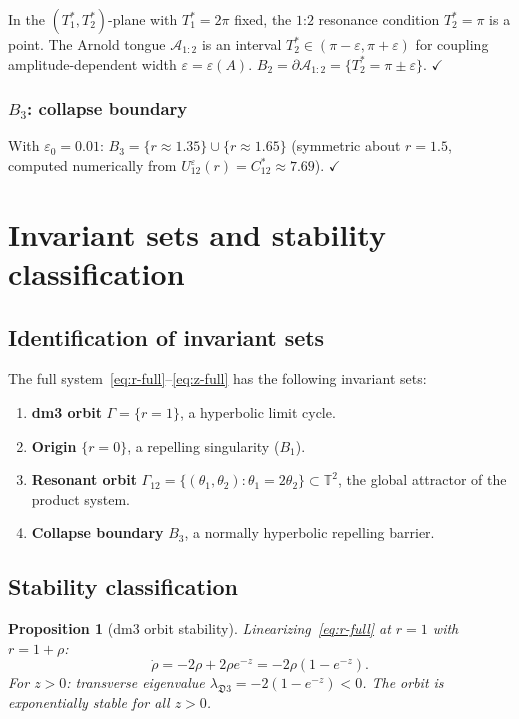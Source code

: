\documentclass[reqno]{amsart}
\numberwithin{equation}{section}
\theoremstyle{plain}
\newtheorem{proposition}[theorem]{Proposition}
\theoremstyle{definition}
\theoremstyle{remark}
\newcommand{\T}{\mathbb{T}}
\newcommand{\dm}{\mathfrak{D}}
\newcommand{\Orb}{\Gamma}
\newcommand{\eps}{\varepsilon}
\begin{document}
In the $(T_1^*,T_2^*)$-plane with $T_1^*=2\pi$ fixed, the $1$:$2$
resonance condition $T_2^*=\pi$ is a point. The Arnold tongue
$\mathcal{A}_{1:2}$ is an interval $T_2^*\in(\pi-\eps,\pi+\eps)$
for coupling amplitude-dependent width $\eps=\eps(A)$.
$B_2=\partial\mathcal{A}_{1:2}=\{T_2^*=\pi\pm\eps\}$. $\checkmark$

\subsubsection{$B_3$: collapse boundary}

With $\eps_0=0.01$: $B_3=\{r\approx 1.35\}\cup\{r\approx 1.65\}$
(symmetric about $r=1.5$, computed numerically from
$U_{12}^\eps(r)=C_{12}^*\approx 7.69$). $\checkmark$

\section{Invariant sets and stability classification}\label{sec:invariants}

\subsection{Identification of invariant sets}

The full system~\eqref{eq:r-full}--\eqref{eq:z-full}
has the following invariant sets:

\begin{enumerate}[label=(\arabic*)]
  \item \textbf{dm3 orbit} $\Orb=\{r=1\}$, a hyperbolic limit cycle.
  \item \textbf{Origin} $\{r=0\}$, a repelling singularity ($B_1$).
  \item \textbf{Resonant orbit} $\Orb_{12}=\{(\theta_1,\theta_2):
        \theta_1=2\theta_2\}\subset\T^2$, the global attractor
        of the product system.
  \item \textbf{Collapse boundary} $B_3$, a normally hyperbolic
        repelling barrier.
\end{enumerate}

\subsection{Stability classification}

\begin{proposition}[dm3 orbit stability]\label{prop:dm3stable}
Linearizing~\eqref{eq:r-full} at $r=1$ with $r=1+\rho$:
\[
  \dot\rho = -2\rho + 2\rho e^{-z} = -2\rho(1-e^{-z}).
\]
For $z>0$: transverse eigenvalue $\lambda_{\dm3}=-2(1-e^{-z})<0$.
The orbit is exponentially stable for all $z>0$.
\end{proposition}
\end{document}
